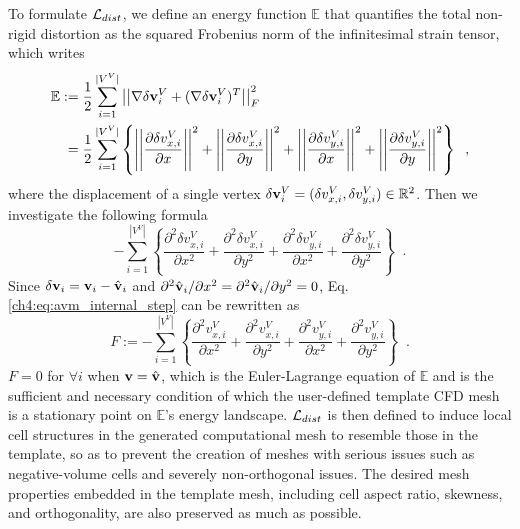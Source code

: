 To formulate $\mathcal{L}_{dist}$, we define an energy function $\mathbb{E}$ that quantifies the total non-rigid distortion as the squared Frobenius norm of the infinitesimal strain tensor, which writes
\begin{align}
    \begin{split}
        \mathbb{E} &:= \frac{1}{2} \sum_{i=1}^{|V^V|} \left|\left| \nabla \delta \mathbf{v}^V_i + (\nabla \delta \mathbf{v}^V_i)^T \right|\right|_F^2  \\
        &\;= \frac{1}{2} \sum_{i=1}^{|V^V|} \left\{ 
        \left|\left| \frac{\partial \delta v^V_{x,i}}{\partial x} \right|\right|^2 + 
        \left|\left| \frac{\partial \delta v^V_{x,i}}{\partial y} \right|\right|^2 + 
        \left|\left| \frac{\partial \delta v^V_{y,i}}{\partial x} \right|\right|^2 + 
        \left|\left| \frac{\partial \delta v^V_{y,i}}{\partial y} \right|\right|^2 \right\} \;\;,
    \end{split}
\end{align}
where the displacement of a single vertex $\delta \mathbf{v}^V_i = (\delta v^V_{x,i}, \delta v^V_{y,i}) \in \mathbb{R}^2$. Then we investigate the following formula
\begin{equation}
    - \sum_{i=1}^{|V^V|} \left\{
    \frac{\partial^2 \delta v^V_{x,i}}{\partial x^2} +
    \frac{\partial^2 \delta v^V_{x,i}}{\partial y^2} +
    \frac{\partial^2 \delta v^V_{y,i}}{\partial x^2} +
    \frac{\partial^2 \delta v^V_{y,i}}{\partial y^2}
    \right\} \;\;.
    \label{ch4:eq:avm_internal_step}
\end{equation}
Since $\delta \mathbf{v}_i = \mathbf{v}_i - \hat{\mathbf{v}}_i$ and $\partial ^2 \hat{\mathbf{v}}_i / \partial x^2 = \partial ^2 \hat{\mathbf{v}}_i / \partial y^2 = 0$, Eq.\ref{ch4:eq:avm_internal_step} can be rewritten as
\begin{equation}
    F := - \sum_{i=1}^{|V^V|} \left\{
    \frac{\partial^2 v^V_{x,i}}{\partial x^2} +
    \frac{\partial^2 v^V_{x,i}}{\partial y^2} +
    \frac{\partial^2 v^V_{y,i}}{\partial x^2} +
    \frac{\partial^2 v^V_{y,i}}{\partial y^2}
    \right\} \;\;.
\end{equation}
$F=0$ for $\forall i$ when $\mathbf{v} = \hat{\mathbf{v}}$, which is the Euler-Lagrange equation of $\mathbb{E}$ and is the sufficient and necessary condition of which the user-defined template CFD mesh is a stationary point on $\mathbb{E}$'s energy landscape. $\mathcal{L}_{dist}$ is then defined to induce local cell structures in the generated computational mesh to resemble those in the template, so as to prevent the creation of meshes with serious issues such as negative-volume cells and severely non-orthogonal issues. The desired mesh properties embedded in the template mesh, including cell aspect ratio, skewness, and orthogonality, are also preserved as much as possible.
